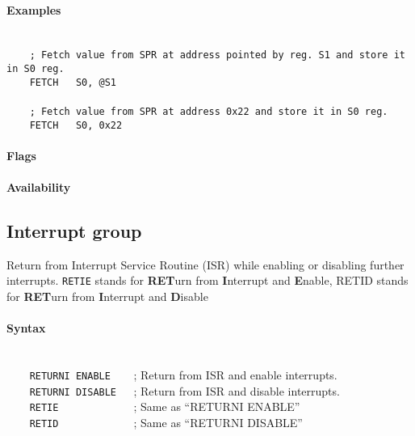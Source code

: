         \paragraph{Examples}
            ~\\
            \verb'    ; Fetch value from SPR at address pointed by reg. S1 and store it in S0 reg.'\\
            \verb'    FETCH   S0, @S1'\\
            \verb''\\
            \verb'    ; Fetch value from SPR at address 0x22 and store it in S0 reg.'\\
            \verb'    FETCH   S0, 0x22'

        \paragraph{Flags}

        \paragraph{Availability}
            \pbavailability{\yes}{\yes}{\no}{\no}{\no}

\clearpage
\subsection{Interrupt group}
        Return from Interrupt Service Routine (ISR) while enabling or disabling further interrupts. \texttt{RETIE} stands for \textbf{RET}urn from \textbf{I}nterrupt and \textbf{E}nable, RETID stands for \textbf{RET}urn from \textbf{I}nterrupt and \textbf{D}isable

        \paragraph{Syntax}
            ~\\
            \verb'    RETURNI ENABLE    '; Return from ISR and enable interrupts.\\
            \verb'    RETURNI DISABLE   '; Return from ISR and disable interrupts.\\
            \verb'    RETIE             '; Same as ``RETURNI ENABLE''\\
            \verb'    RETID             '; Same as ``RETURNI DISABLE''

